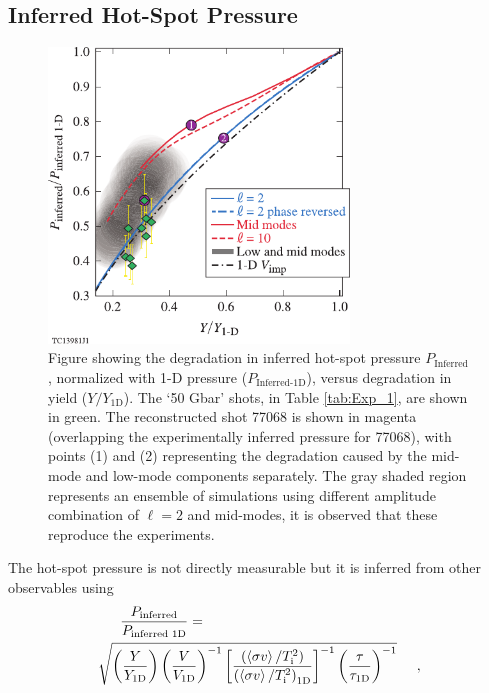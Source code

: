 \documentclass[aip,reprint]{revtex4-1}
\begin{document}
\subsection{Inferred Hot-Spot Pressure}
\label{sec:Exp_pressure}
%
%
%
%
\begin{figure}
\includegraphics[width=80mm]{Fig6_Bose}
\caption{\label{fig:Exp_pressure} Figure showing the degradation in inferred hot-spot pressure $P_\text{Inferred}$, normalized with 1-D pressure ($P_\text{Inferred-1D}$), versus degradation in yield ($Y/Y_\text{1D}$). The `50 Gbar' shots, in Table \ref{tab:Exp_1}, are shown in green. The reconstructed shot 77068 is shown in magenta (overlapping the experimentally inferred pressure for 77068), with points (1) and (2) representing the degradation caused by the mid-mode and low-mode components separately. The gray shaded region represents an ensemble of simulations using different amplitude combination of $\ell=2$ and mid-modes, it is observed that these reproduce the experiments.}
\end{figure}
%
%
The hot-spot pressure is not directly measurable but it is inferred from other observables using \cite{Exp_SC}
%
%
%
\begin{eqnarray}
\label{eqn:Exp_pressure}
\frac{P_\text{inferred}}{P_\text{inferred 1D}} =  \hspace{55mm} \nonumber
\\
\sqrt{ \left( \frac{Y}{Y_\text{1D}} \right)  \left( \frac{V}{V_\text{1D}} \right)^{-1}   \left[ \frac{\left( \left< \sigma v  \right>/T_\text{i}^2 \right)}{\left( \left< \sigma v  \right>/T_\text{i}^2 \right)_\text{1D}} \right]^{-1}  \left( \frac{\tau}{\tau_\text{1D}} \right)^{-1}  } \hspace{5mm},
\end{eqnarray}
\end{document}
